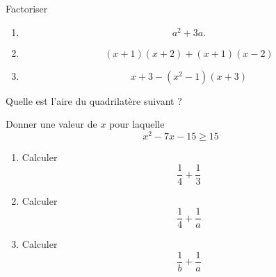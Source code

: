     \begin{mental}
    Factoriser
    \begin{enumerate}
        \item
            \begin{equation*}
                a^2+3a.
            \end{equation*}
        \item
            \begin{equation*}
                (x+1)(x+2)+(x+1)(x-2)
            \end{equation*}
        \item 
    \begin{equation*}
        x+3-(x^2-1)(x+3)
    \end{equation*}
    \end{enumerate}
    \end{mental}

\begin{mental}
       
        Quelle est l'aire du quadrilatère suivant ?

        \begin{center}
            
        \end{center}

\end{mental}

\begin{mental}
    Donner une valeur de \( x\) pour laquelle 
    \begin{equation}
        x^2-7x-15\geq 15
    \end{equation}
\end{mental}

\begin{mental}
    \begin{enumerate}
        \item
            Calculer
            \begin{equation*}
                \frac{1}{ 4 }+\frac{1}{ 3 }
            \end{equation*}
        \item
            Calculer 
            \begin{equation*}
                \frac{1}{ 4 }+\frac{1}{ a }
            \end{equation*}
        \item
            Calculer
            \begin{equation*}
                \frac{1}{ b }+\frac{1}{ a }
            \end{equation*}
    \end{enumerate}
\end{mental}

